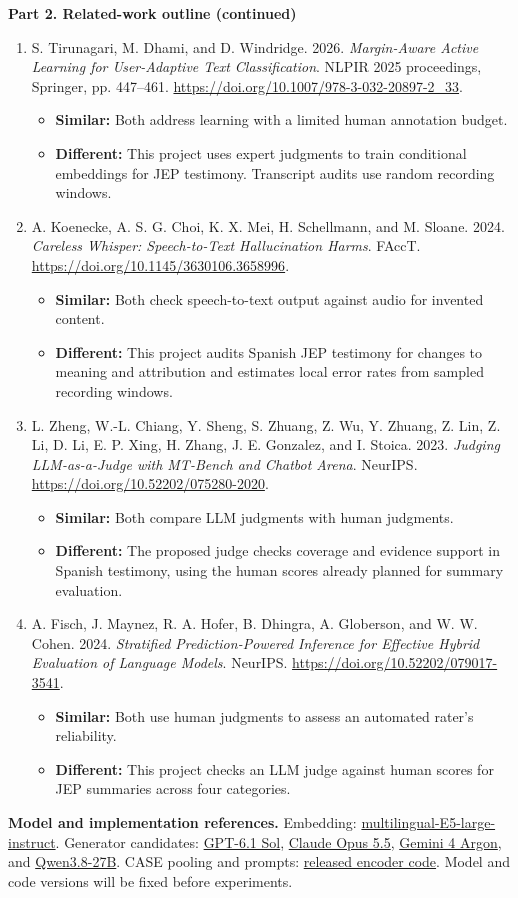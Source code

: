 \documentclass[11pt,letterpaper]{article}
\newcommand{\paperentry}[3]{\item\relax #1
\begin{itemize}\item \textbf{Similar:} #2
\item \textbf{Different:} #3\end{itemize}\vspace{5pt}}
\begin{document}
\clearpage
\textbf{Part 2. Related-work outline (continued)}
\begin{enumerate}[label=\textbf{\arabic*.},leftmargin=*,start=11]
\paperentry{S. Tirunagari, M. Dhami, and D. Windridge. 2026. \emph{Margin-Aware Active Learning for User-Adaptive Text Classification}. NLPIR 2025 proceedings, Springer, pp. 447--461. \url{https://doi.org/10.1007/978-3-032-20897-2_33}.}
{Both address learning with a limited human annotation budget.}
{This project uses expert judgments to train conditional embeddings for JEP testimony. Transcript audits use random recording windows.}

\paperentry{A. Koenecke, A. S. G. Choi, K. X. Mei, H. Schellmann, and M. Sloane. 2024. \emph{Careless Whisper: Speech-to-Text Hallucination Harms}. FAccT. \url{https://doi.org/10.1145/3630106.3658996}.}
{Both check speech-to-text output against audio for invented content.}
{This project audits Spanish JEP testimony for changes to meaning and attribution and estimates local error rates from sampled recording windows.}

\paperentry{L. Zheng, W.-L. Chiang, Y. Sheng, S. Zhuang, Z. Wu, Y. Zhuang, Z. Lin, Z. Li, D. Li, E. P. Xing, H. Zhang, J. E. Gonzalez, and I. Stoica. 2023. \emph{Judging LLM-as-a-Judge with MT-Bench and Chatbot Arena}. NeurIPS. \url{https://doi.org/10.52202/075280-2020}.}
{Both compare LLM judgments with human judgments.}
{The proposed judge checks coverage and evidence support in Spanish testimony, using the human scores already planned for summary evaluation.}

\paperentry{A. Fisch, J. Maynez, R. A. Hofer, B. Dhingra, A. Globerson, and W. W. Cohen. 2024. \emph{Stratified Prediction-Powered Inference for Effective Hybrid Evaluation of Language Models}. NeurIPS. \url{https://doi.org/10.52202/079017-3541}.}
{Both use human judgments to assess an automated rater's reliability.}
{This project checks an LLM judge against human scores for JEP summaries across four categories.}
\end{enumerate}

\textbf{Model and implementation references.}
Embedding: \href{https://huggingface.co/intfloat/multilingual-e5-large-instruct}{multilingual-E5-large-instruct}.
Generator candidates: \href{https://developers.openai.com/api/docs/models/gpt-6.1-sol}{GPT-6.1 Sol},
\href{https://platform.claude.com/docs/en/models/opus-5-5/overview}{Claude Opus 5.5},
\href{https://ai.google.dev/gemini-api/docs/models/gemini-4-argon}{Gemini 4 Argon}, and
\href{https://huggingface.co/Qwen/Qwen3.8-27B}{Qwen3.8-27B}.
CASE pooling and prompts: \href{https://github.com/LivNLP/CASE/blob/main/llm_encoders.py}{released encoder code}. Model and code versions will be fixed before experiments.
\end{document}
